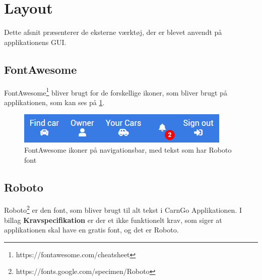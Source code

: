 \documentclass[Implementering/Implementering_main.tex]{subfiles}
\begin{document}
\section{Layout}
Dette afsnit præsenterer de eksterne værktøj, der er blevet anvendt på applikationens GUI.


\subsection{FontAwesome}
FontAwesome\footnote{https://fontawesome.com/cheatsheet} bliver brugt for de forskellige ikoner, som bliver brugt på applikationen, som kan ses på \ref{fig:FontAwesomeIcons}. 

\begin{figure}
    \centering
    \includegraphics{Implementering/Graphic/FontAwesome.png}
    \caption{FontAwesome ikoner på navigationsbar, med tekst som har Roboto font}
    \label{fig:FontAwesomeIcons}
\end{figure}


\subsection{Roboto}
Roboto\footnote{https://fonts.google.com/specimen/Roboto} er den font, som bliver brugt til alt tekst i CarnGo Applikationen. I billag \textbf{Kravspecifikation} er der et ikke funktionelt krav, som siger at applikationen skal have en gratis font, og det er Roboto. 
\end{document}
